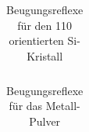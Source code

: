 \begin{table}[h]
\caption{Beugungsreflexe für den 110 orientierten \textsf{Si}-Kristall}
\begin{tabular}{*{12}c}
	\toprule
	\midrule
	\bottomrule
\end{tabular}
\end{table}

\begin{table}[h]
\caption{Beugungsreflexe für das Metall-Pulver}
\begin{tabular}{*{12}c}
	\toprule
	\midrule
	\bottomrule
\end{tabular}
\end{table}













